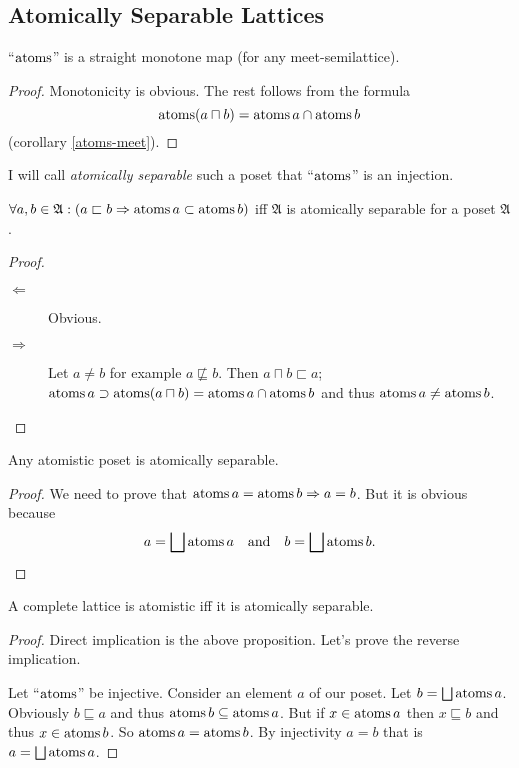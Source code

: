 \subsection{\label{atm-sep}Atomically Separable Lattices}
\begin{prop}
``$\operatorname{atoms}$'' is a straight monotone map (for any meet-semilattice).\end{prop}
\begin{proof}
Monotonicity is obvious. The rest follows from the formula
\[
\operatorname{atoms}(a\sqcap b)=\operatorname{atoms} a\cap\operatorname{atoms} b
\]
(corollary \ref{atoms-meet}).\end{proof}
\begin{defn}
I will call \emph{atomically separable}
such a poset that ``$\operatorname{atoms}$'' is an injection.\end{defn}
\begin{prop}
$\forall a,b\in\mathfrak{A}:(a\sqsubset b\Rightarrow\operatorname{atoms} a\subset\operatorname{atoms} b)$
iff $\mathfrak{A}$ is atomically separable for a poset $\mathfrak{A}$.\end{prop}
\begin{proof}
~
\begin{description}
\item [{$\Leftarrow$}] Obvious.
\item [{$\Rightarrow$}] Let $a\neq b$ for example $a\nsqsubseteq b$.
Then $a\sqcap b\sqsubset a$; $\operatorname{atoms} a\supset\operatorname{atoms}(a\sqcap b)=\operatorname{atoms} a\cap\operatorname{atoms} b$
and thus $\operatorname{atoms} a\neq\operatorname{atoms} b$.
\end{description}
\end{proof}
\begin{prop}
\label{atms-is-asep}Any atomistic poset is atomically separable.\end{prop}
\begin{proof}
We need to prove that $\operatorname{atoms} a=\operatorname{atoms} b\Rightarrow a=b$. But it
is obvious because
\[
a=\bigsqcup\operatorname{atoms} a\quad\text{and}\quad b=\bigsqcup\operatorname{atoms} b.
\]
\end{proof}
\begin{thm}
\label{amstc-sep}A complete lattice is atomistic iff it is atomically
separable.\end{thm}
\begin{proof}
Direct implication is the above proposition. Let's prove the reverse
implication.

Let ``$\operatorname{atoms}$'' be injective. Consider an element $a$ of our
poset. Let $b=\bigsqcup\operatorname{atoms} a$. Obviously $b\sqsubseteq a$ and
thus $\operatorname{atoms} b\subseteq\operatorname{atoms} a$. But if $x\in\operatorname{atoms} a$ then $x\sqsubseteq b$
and thus $x\in\operatorname{atoms} b$. So $\operatorname{atoms} a=\operatorname{atoms} b$. By injectivity
$a=b$ that is $a=\bigsqcup\operatorname{atoms} a$.\end{proof}
